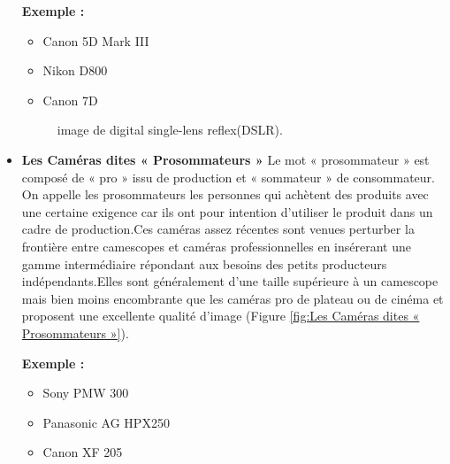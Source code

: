 \begin{itemize}
 	\textbf{Exemple :}
 	
 	\begin{itemize}
 		\item Canon 5D Mark III
 		\item Nikon D800
 		\item Canon 7D
 	\end{itemize}
 	
 	\begin{figure}[H]%
 		\center%
 		\setlength{\fboxsep}{5pt}%
 		\setlength{\fboxrule}{0.5pt}%
 	 \caption[digital single-lens reflex(DSLR)]{image de digital single-lens reflex(DSLR).}
 	\label{fig:digital single-lens reflex(DSLR)}
 	\end{figure}
 	
 	\item \textbf{Les Caméras dites « Prosommateurs »} Le mot « prosommateur » est composé de « pro » issu de production et « sommateur » de consommateur. On appelle les prosommateurs les personnes qui achètent des produits avec une certaine exigence car ils ont pour intention d’utiliser le produit dans un cadre de production.Ces caméras assez récentes sont venues perturber la frontière entre camescopes et caméras professionnelles en insérerant une gamme intermédiaire répondant aux besoins des petits producteurs indépendants.Elles sont généralement d’une taille supérieure à un camescope mais bien moins encombrante que les caméras pro de plateau ou de cinéma et proposent une excellente qualité d’image (Figure \ref{fig:Les Caméras dites « Prosommateurs »}).
 	
 	\textbf{Exemple :}
 	
 	\begin{itemize}
 		\item Sony PMW 300
 		\item Panasonic AG HPX250
 		\item Canon XF 205
 	\end{itemize}
  

\end{itemize}
